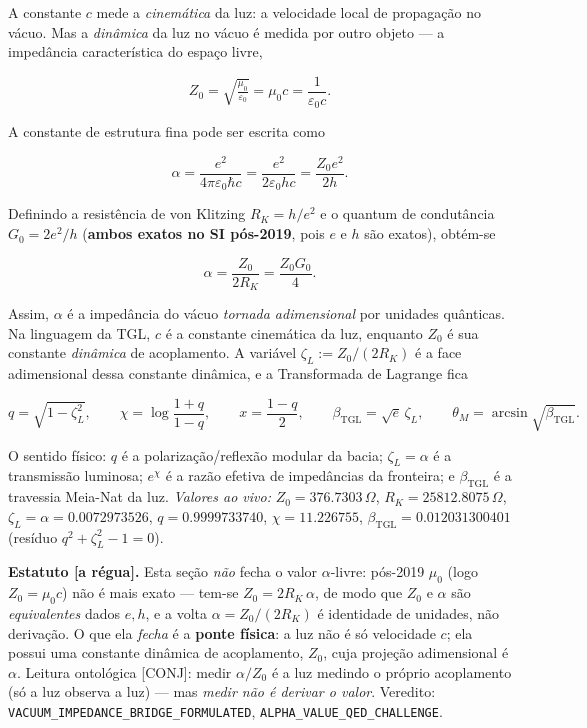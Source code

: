 \documentclass[11pt]{article}
\newcommand{\bTGL}{\beta_{\mathrm{TGL}}}\newcommand{\Msun}{M_{\odot}}\newcommand{\TGL}{\mathrm{TGL}}
\theoremstyle{definition}\newtheorem{deriv}{Derivação}
\begin{document}
A constante $c$ mede a \emph{cinemática} da luz: a velocidade local de propagação no vácuo. Mas a \emph{dinâmica} da luz no vácuo é medida por outro objeto --- a impedância característica do espaço livre,

\begin{equation} Z_0=\sqrt{\tfrac{\mu_0}{\varepsilon_0}}=\mu_0 c=\frac{1}{\varepsilon_0 c}.\end{equation}

A constante de estrutura fina pode ser escrita como

\begin{equation} \alpha=\frac{e^2}{4\pi\varepsilon_0\hbar c}=\frac{e^2}{2\varepsilon_0 h c}=\frac{Z_0 e^2}{2h}.\end{equation}

Definindo a resistência de von Klitzing $R_K=h/e^2$ e o quantum de condutância $G_0=2e^2/h$ (\textbf{ambos exatos no SI pós-2019}, pois $e$ e $h$ são exatos), obtém-se

\begin{equation} \alpha=\frac{Z_0}{2R_K}=\frac{Z_0 G_0}{4}.\end{equation}

Assim, $\alpha$ é a impedância do vácuo \emph{tornada adimensional} por unidades quânticas. Na linguagem da TGL, $c$ é a constante cinemática da luz, enquanto $Z_0$ é sua constante \emph{dinâmica} de acoplamento. A variável $\zeta_L:=Z_0/(2R_K)$ é a face adimensional dessa constante dinâmica, e a Transformada de Lagrange fica

\begin{equation} q=\sqrt{1-\zeta_L^2},\qquad \chi=\log\frac{1+q}{1-q},\qquad x=\frac{1-q}{2},\qquad \bTGL=\sqrt e\,\zeta_L,\qquad \theta_M=\arcsin\sqrt{\bTGL}.\end{equation}

O sentido físico: $q$ é a polarização/reflexão modular da bacia; $\zeta_L=\alpha$ é a transmissão luminosa; $e^\chi$ é a razão efetiva de impedâncias da fronteira; e $\bTGL$ é a travessia Meia-Nat da luz. \emph{Valores ao vivo:} $Z_0=376.7303\,\Omega$, $R_K=25812.8075\,\Omega$, $\zeta_L=\alpha=0.0072973526$, $q=0.9999733740$, $\chi=11.226755$, $\bTGL=0.012031300401$ (resíduo $q^2+\zeta_L^2-1=0$).

\textbf{Estatuto \textsf{[a régua]}.} Esta seção \emph{não} fecha o valor $\alpha$-livre: pós-2019 $\mu_0$ (logo $Z_0=\mu_0 c$) não é mais exato --- tem-se $Z_0=2R_K\,\alpha$, de modo que $Z_0$ e $\alpha$ são \emph{equivalentes} dados $e,h$, e a volta $\alpha=Z_0/(2R_K)$ é identidade de unidades, não derivação. O que ela \emph{fecha} é a \textbf{ponte física}: a luz não é só velocidade $c$; ela possui uma constante dinâmica de acoplamento, $Z_0$, cuja projeção adimensional é $\alpha$. Leitura ontológica \textsf{[CONJ]}: medir $\alpha/Z_0$ é a luz medindo o próprio acoplamento (só a luz observa a luz) --- mas \emph{medir não é derivar o valor}. Veredito: \texttt{VACUUM\_IMPEDANCE\_BRIDGE\_FORMULATED}, \texttt{ALPHA\_VALUE\_QED\_CHALLENGE}.
\end{document}
